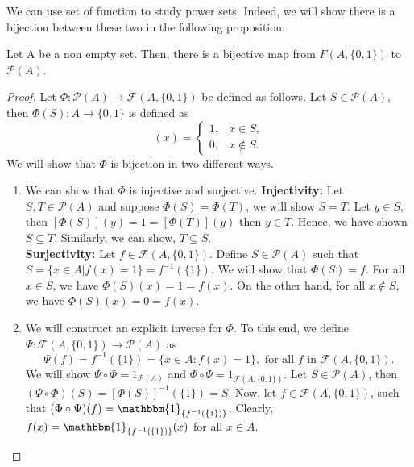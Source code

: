 \documentclass[a4paper,english,12pt]{article}   	%
\begin{document}
We can use set of function to study power sets. Indeed, we will show there is a bijection between these two in the following proposition.
\begin{prop} Let A be a non empty set. Then, there is a bijective map from $F(A,\{0,1\})$ to $\mathcal{P}(A)$.
\end{prop}
\begin{proof} Let $\Phi \colon \mathcal{P}(A) \to \mathcal{F}(A,\{0,1\})$ be defined as follows. Let $S \in \mathcal{P}(A)$, then $\Phi(S) \colon A \to \{0,1\}$ is defined as
\begin{equation*}
[\Phi (S)](x) = \begin{cases}1, &  x \in S,\\0,  & x \notin S.\end{cases}
\end{equation*}
We will show that $\Phi$ is bijection in two different ways.
\begin{enumerate}
\item We can show that $\Phi$ is injective and surjective.
\textbf{Injectivity:} Let $S,T \in \mathcal{P}(A)$ and suppose $\Phi (S)=\Phi (T)$, we will show $S=T$. Let $y \in S$, then $[\Phi (S)](y) = 1 = [\Phi (T)](y)$ then $y \in T$. Hence, we have shown $S \subseteq T$. Similarly, we can show, $T \subseteq S$.\\
\textbf{Surjectivity:} Let $f \in \mathcal{F}(A,\{0,1\})$. Define $S \in \mathcal{P}(A)$ such that $S = \{x \in A | f(x) = 1\} = f^{-1}(\{1\})$. We will show that $\Phi(S) = f$. For all $x \in S$, we have $\Phi(S)(x) = 1 = f(x)$. On the other hand, for all $x \notin S$, we have $\Phi(S)(x) = 0 = f(x)$.
\item We will construct an explicit inverse for $\Phi$. To this end, we define $\Psi : \mathcal{F}(A, \{0,1\}) \to \mathcal{P}(A)$ as
\begin{equation*}
\Psi(f) = f^{-1}(\{1\}) = \{x \in A : f(x) = 1\}, \text{ for all } f \text{ in } \mathcal{F}(A, \{0, 1\}).
\end{equation*}
We will show $\Psi \circ \Phi = 1_{\mathcal{P}(A)}$ and $\Phi \circ \Psi = 1_{\mathcal{F}(A, \{0,1\})}$. Let $S \in \mathcal{P}(A)$, then $(\Psi \circ \Phi)(S) = [\Phi(S)]^{-1}(\{1\}) = S$. Now, let $f \in \mathcal{F}(A, \{0,1\})$, such that $(\Phi \circ \Psi)(f) = \mathbbm{1}_{\{f^{-1}(\{1\})\}}$. Clearly, $f(x) = \mathbbm{1}_{\{f^{-1}(\{1\})\}}(x)$ for all $x \in A$.
\end{enumerate}
\end{proof}
\end{document}
